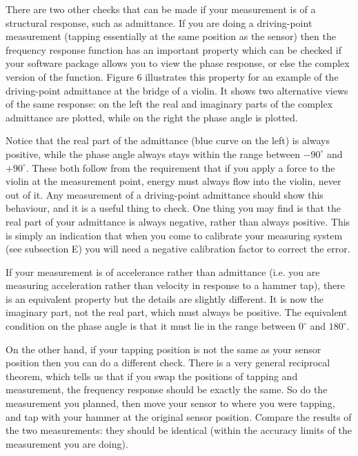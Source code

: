 
  There are two other checks that can be made if your measurement is of a 
  structural response, such as admittance. If you are doing a driving-point 
  measurement (tapping essentially at the same position as the sensor) then the 
  frequency response function has an important property which can be checked if 
  your software package allows you to view the phase response, or else the 
  complex version of the function. Figure 6 illustrates this property for an 
  example of the driving-point admittance at the bridge of a violin. It shows 
  two alternative views of the same response: on the left the real and 
  imaginary parts of the complex admittance are plotted, while on the right the 
  phase angle is plotted. 



  Notice that the real part of the admittance (blue curve on the left) is 
  always positive, while the phase angle always stays within the range between 
  $-90^\circ$ and $+90^\circ$. These both follow from the requirement that if 
  you apply a force to the violin at the measurement point, energy must always 
  flow into the violin, never out of it. Any measurement of a driving-point 
  admittance should show this behaviour, and it is a useful thing to check. One 
  thing you may find is that the real part of your admittance is always 
  negative, rather than always positive. This is simply an indication that when 
  you come to calibrate your measuring system (see subsection E) you will need 
  a negative calibration factor to correct the error. 

  If your measurement is of accelerance rather than admittance (i.e. you are 
  measuring acceleration rather than velocity in response to a hammer tap), 
  there is an equivalent property but the details are slightly different. It is 
  now the imaginary part, not the real part, which must always be positive. The 
  equivalent condition on the phase angle is that it must lie in the range 
  between $0^\circ$ and $180^\circ$. 

  On the other hand, if your tapping position is not the same as your sensor 
  position then you can do a different check. There is a very general 
  reciprocal theorem, which tells us that if you swap the positions of tapping 
  and measurement, the frequency response should be exactly the same. So do the 
  measurement you planned, then move your sensor to where you were tapping, and 
  tap with your hammer at the original sensor position. Compare the results of 
  the two measurements: they should be identical (within the accuracy limits of 
  the measurement you are doing). 


